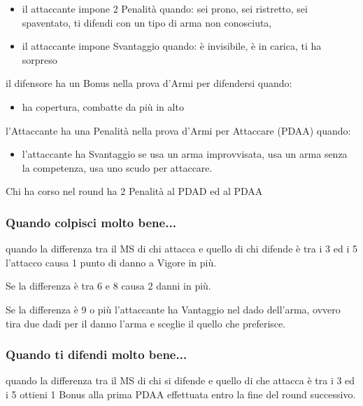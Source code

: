 \documentclass[12pt,a4paper,twoside,openany]{book}
\begin{document}
\begin{multicols}{2}
\begin{itemize}
\item 
il attaccante impone 2 Penalità quando:
\subitem sei prono, sei ristretto, sei spaventato, ti difendi con un tipo di arma non conosciuta, 

\item 
il attaccante impone Svantaggio quando:
\subitem è invisibile, è in carica, ti ha sorpreso

\end{itemize}

il difensore ha un Bonus nella prova d'Armi per difendersi quando:

\begin{itemize}
	
\item 
ha copertura, combatte da più in alto

\end{itemize}


l'Attaccante ha una Penalità nella prova d'Armi per Attaccare (PDAA) quando:

\begin{itemize}

\item 
l'attaccante ha Svantaggio se usa un arma improvvisata, usa un arma senza la competenza, usa uno scudo per attaccare.
	
\end{itemize}

Chi ha corso nel round ha 2 Penalità al PDAD ed al PDAA


\subsubsection{Quando colpisci molto bene...}

quando la differenza tra il MS di chi attacca e quello di chi difende è tra i 3 ed i 5 l'attacco causa 1 punto di danno a Vigore in più.

Se la differenza è tra 6 e 8 causa 2 danni in più.

Se la differenza è 9 o più l'attaccante ha Vantaggio nel dado dell'arma, ovvero tira due dadi per il danno l'arma e sceglie il quello che preferisce.

\subsubsection{Quando ti difendi molto bene...}

quando la differenza tra il MS di chi si difende e quello di che attacca è tra i 3 ed i 5 ottieni 1 Bonus alla prima PDAA effettuata entro la fine del round successivo.


\end{multicols}
\end{document}
